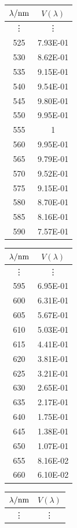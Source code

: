 \begin{table}[H]
\begin{minipage}{0.19\textwidth}
\begin{tabular}{cc}
\toprule
$\lambda/{\rm nm}$ & $V(\lambda)$ \\
\midrule
\vdots & \vdots\\
525 & 7.93E-01 \\
530 & 8.62E-01 \\
535 & 9.15E-01 \\
540 & 9.54E-01 \\
545 & 9.80E-01 \\
550 & 9.95E-01 \\
555 & 1 \\
560 & 9.95E-01 \\
565 & 9.79E-01 \\
570 & 9.52E-01 \\
575 & 9.15E-01 \\
580 & 8.70E-01 \\
585 & 8.16E-01 \\
590 & 7.57E-01 \\
\bottomrule
\end{tabular}
\end{minipage} 
\begin{minipage}{0.19\textwidth}
\begin{tabular}{cc}
\toprule
$\lambda/{\rm nm}$ & $V(\lambda)$ \\
\midrule
\vdots & \vdots\\
595 & 6.95E-01 \\
600 & 6.31E-01 \\
605 & 5.67E-01 \\
610 & 5.03E-01 \\
615 & 4.41E-01 \\
620 & 3.81E-01 \\
625 & 3.21E-01 \\
630 & 2.65E-01 \\
635 & 2.17E-01 \\
640 & 1.75E-01 \\
645 & 1.38E-01 \\
650 & 1.07E-01 \\
655 & 8.16E-02 \\
660 & 6.10E-02 \\
\bottomrule
\end{tabular}
\end{minipage}
\begin{minipage}{0.19\textwidth}
\begin{tabular}{cc}
\toprule
$\lambda/{\rm nm}$ & $V(\lambda)$ \\
\midrule
\vdots & \vdots\\

\end{tabular}
\end{minipage}
\end{table}
